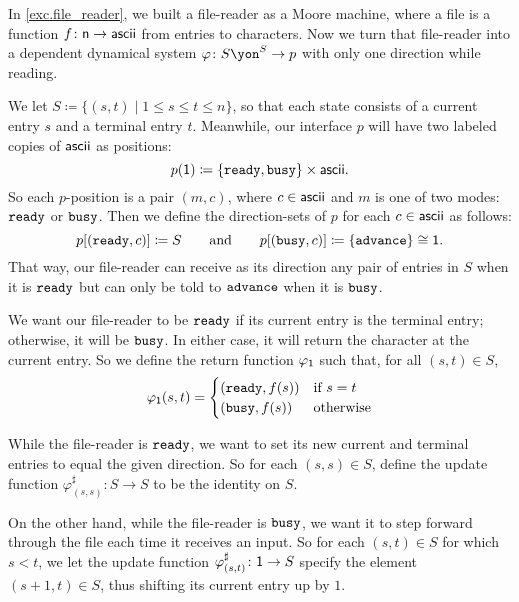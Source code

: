 \documentclass[Book-Poly]{subfiles}
\begin{document}
\begin{example}\label{ex.generalized_file_reader}
In \cref{exc.file_reader}, we built a file-reader as a Moore machine, where a file is a function $f\colon\mathsf{n}\to\mathsf{ascii}$ from entries to characters.
Now we turn that file-reader into a dependent dynamical system $\varphi\colon S\yon^S\to p$ with only one direction while reading.

We let $S \coloneqq \{(s,t)\mid 1\leq s\leq t\leq n\}$, so that each state consists of a current entry $s$ and a terminal entry $t$.
Meanwhile, our interface $p$ will have two labeled copies of $\mathsf{ascii}$ as positions:
\[
    p(\textsf{1})\coloneqq\{\texttt{ready},\texttt{busy}\}\times\mathsf{ascii}.
\]
So each $p$-position is a pair $(m,c)$, where $c\in\mathsf{ascii}$ and $m$ is one of two modes: $\texttt{ready}$ or $\texttt{busy}$.
Then we define the direction-sets of $p$ for each $c\in\mathsf{ascii}$ as follows:
\[
    p[(\texttt{ready}, c)]\coloneqq S \qquad\text{and}\qquad p[(\texttt{busy}, c)]\coloneqq\{\texttt{advance}\}\cong\textsf{1}.
\]
That way, our file-reader can receive as its direction any pair of entries in $S$ when it is $\texttt{ready}$ but can only be told to $\texttt{advance}$ when it is $\texttt{busy}$.

We want our file-reader to be $\texttt{ready}$ if its current entry is the terminal entry; otherwise, it will be $\texttt{busy}$.
In either case, it will return the character at the current entry.
So we define the return function $\varphi_{\textsf{1}}$ such that, for all $(s,t)\in S$,
\begin{align*}
  \varphi_{\textsf{1}}(s, t) =
  \begin{cases}
    (\text{\texttt{ready}}, f(s)) &\mbox{if $s = t$}\\
    (\text{\texttt{busy}}, f(s)) &\mbox{otherwise}
  \end{cases}
\end{align*}

While the file-reader is $\texttt{ready}$, we want to set its new current and terminal entries to equal the given direction.
So for each $(s,s)\in S$, define the update function $\varphi^\sharp_{(s,s)}\colon S\to S$ to be the identity on $S$.

On the other hand, while the file-reader is $\texttt{busy}$, we want it to step forward through the file each time it receives an input.
So for each $(s,t)\in S$ for which $s<t$, we let the update function $\varphi^\sharp_{(s,t)}\colon\textsf{1}\to S$ specify the element $(s+1,t)\in S$, thus shifting its current entry up by $1$.
\end{example}
\end{document}
